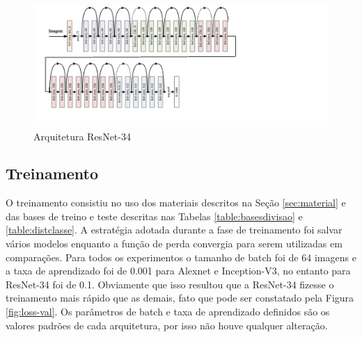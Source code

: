 \begin{figure}
\centering
\includegraphics[scale=0.83]{figuras/resnet-34.png}
\caption{Arquitetura ResNet-34}
\label{fig:resnet-34}
\end{figure}



\subsection{Treinamento}
O treinamento consistiu no uso dos materiais descritos na Seção \ref{sec:material} e das bases de treino e teste descritas nas Tabelas \ref{table:basesdivisao} e \ref{table:distclasse}. A estratégia adotada durante a fase de treinamento foi salvar vários modelos enquanto a função de perda convergia para serem utilizadas em comparações. Para todos os experimentos o tamanho de batch foi de 64 imagens e a taxa de aprendizado foi de 0.001 para Alexnet e Inception-V3, no entanto para ResNet-34 foi de 0.1. Obviamente que isso resultou que a ResNet-34 fizesse o treinamento mais rápido que as demais, fato que pode ser constatado pela Figura \ref{fig:loss-val}. Os parâmetros de batch e taxa de aprendizado definidos são os valores padrões de cada arquitetura, por isso não houve qualquer alteração. 





